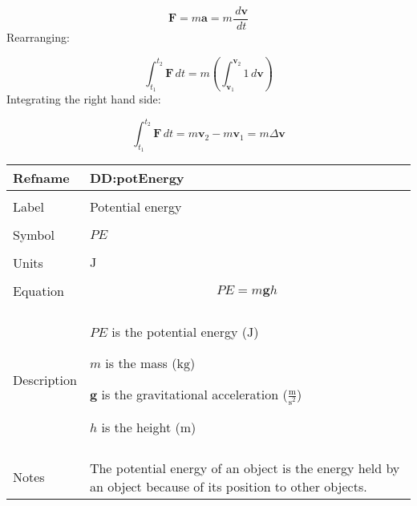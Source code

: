 \documentclass[12pt]{article}
\begin{document}
\begin{displaymath}
\symbf{F}=m \symbf{a}=m \frac{\,d\symbf{v}}{\,dt}
\end{displaymath}
Rearranging:

\begin{displaymath}
\int_{{t_{1}}}^{{t_{2}}}{\symbf{F}}\,dt=m \left(\int_{{\symbf{v}_{1}}}^{{\symbf{v}_{2}}}{1}\,d\symbf{v}\right)
\end{displaymath}
Integrating the right hand side:

\begin{displaymath}
\int_{{t_{1}}}^{{t_{2}}}{\symbf{F}}\,dt=m {\symbf{v}_{2}}-m {\symbf{v}_{1}}=m Δ\symbf{v}
\end{displaymath}
\vspace{\baselineskip}
\noindent
\begin{minipage}{\textwidth}
\begin{tabular}{>{\raggedright}p{}>{\raggedright\arraybackslash}p{}}
\toprule \textbf{Refname} & \textbf{DD:potEnergy}
\label{DD:potEnergy}
\\ \midrule \\
Label & Potential energy
        
\\ \midrule \\
Symbol & $PE$
         
\\ \midrule \\
Units & ${\text{J}}$
        
\\ \midrule \\
Equation & \begin{displaymath}
           PE=m \symbf{g} h
           \end{displaymath}
\\ \midrule \\
Description & \begin{symbDescription}
              \item{$PE$ is the potential energy (${\text{J}}$)}
              \item{$m$ is the mass (${\text{kg}}$)}
              \item{$\symbf{g}$ is the gravitational acceleration ($\frac{\text{m}}{\text{s}^{2}}$)}
              \item{$h$ is the height (${\text{m}}$)}
              \end{symbDescription}
\\ \midrule \\
Notes & The potential energy of an object is the energy held by an object because of its position to other objects.
        

\end{tabular}
\end{minipage}
\end{document}
